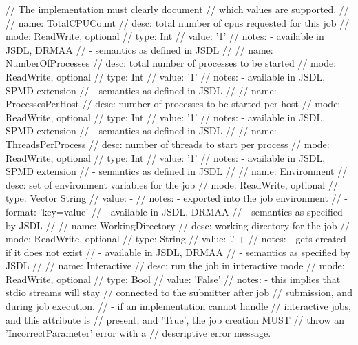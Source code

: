 \begin{myspec}
{{      //            The implementation must clearly document
      //            which values are supported.
      //
      //   name:  TotalCPUCount
      //   desc:  total number of cpus requested for this job
      //   mode:  ReadWrite, optional
      //   type:  Int
      //   value: '1'
      //   notes: - available in JSDL, DRMAA
      //          - semantics as defined in JSDL
      // 
      //   name:  NumberOfProcesses
      //   desc:  total number of processes to be started
      //   mode:  ReadWrite, optional
      //   type:  Int
      //   value: '1'
      //   notes: - available in JSDL, SPMD extension
      //          - semantics as defined in JSDL
      // 
      //   name:  ProcessesPerHost
      //   desc:  number of processes to be started per host
      //   mode:  ReadWrite, optional
      //   type:  Int
      //   value: '1'
      //   notes: - available in JSDL, SPMD extension
      //          - semantics as defined in JSDL
      // 
      //   name:  ThreadsPerProcess
      //   desc:  number of threads to start per process
      //   mode:  ReadWrite, optional
      //   type:  Int
      //   value: '1'
      //   notes: - available in JSDL, SPMD extension
      //          - semantics as defined in JSDL
      // 
      //   name:  Environment
      //   desc:  set of environment variables for the job
      //   mode:  ReadWrite, optional
      //   type:  Vector String
      //   value: -
      //   notes: - exported into the job environment
      //          - format: 'key=value'
      //          - available in JSDL, DRMAA
      //          - semantics as specified by JSDL
      // 
      //   name:  WorkingDirectory
      //   desc:  working directory for the job
      //   mode:  ReadWrite, optional
      //   type:  String
      //   value: '.'
+     //   notes: - gets created if it does not exist
      //          - available in JSDL, DRMAA
      //          - semantics as specified by JSDL
      // 
      //   name:  Interactive
      //   desc:  run the job in interactive mode
      //   mode:  ReadWrite, optional
      //   type:  Bool
      //   value: 'False'
      //   notes: - this implies that stdio streams will stay 
      //            connected to the submitter after job 
      //            submission, and during job execution. 
      //          - if an implementation cannot handle
      //            interactive jobs, and this attribute is
      //            present, and 'True', the job creation MUST
      //            throw an 'IncorrectParameter' error with a
      //            descriptive error message.
}}
\end{myspec}
